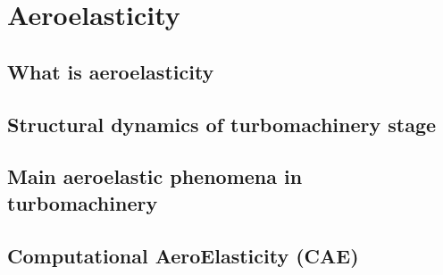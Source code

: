\chapter{Aeroelasticity}
\label{cha:ael}

\chabstract{}

\minitoc
\newpage

\section{What is aeroelasticity}
\label{sec:what_is_ael}


\section{Structural dynamics of turbomachinery stage}
\label{sec:structural_dynamic}


\section{Main aeroelastic phenomena in turbomachinery}
\label{sec:ael_phenomena}


\section{Computational AeroElasticity (CAE)}
\label{sec:ael_cae}


\chconclu{}
